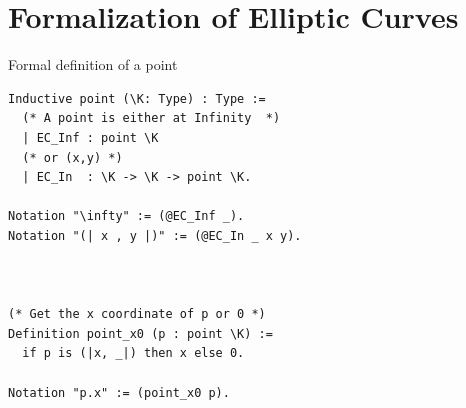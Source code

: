 \documentclass[8pt]{beamer}
\begin{document}
%
%
\section{Formalization of Elliptic Curves}

\begin{frame}[fragile]{Formal definition of a point}
\begin{center}
\begin{lstlisting}[language=Coq, basicstyle=\normalsize]
Inductive point (\K: Type) : Type :=
  (* A point is either at Infinity  *)
  | EC_Inf : point \K
  (* or (x,y) *)
  | EC_In  : \K -> \K -> point \K.

Notation "\infty" := (@EC_Inf _).
Notation "(| x , y |)" := (@EC_In _ x y).



(* Get the x coordinate of p or 0 *)
Definition point_x0 (p : point \K) :=
  if p is (|x, _|) then x else 0.

Notation "p.x" := (point_x0 p).
\end{lstlisting}
\end{center}
\end{frame}
\end{document}
